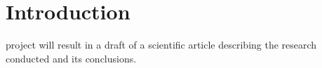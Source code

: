 \section{Introduction}
% 
% 
% 
% 
 project will result in a draft of a scientific article describing the research conducted and its conclusions.


%
%



